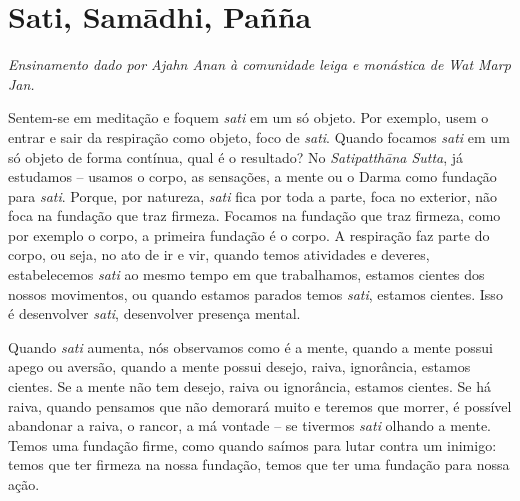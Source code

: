 
\chapter{Sati, Sam\=adhi, Pañña}

{\itshape
Ensinamento dado por Ajahn Anan à comunidade leiga e monástica de Wat
Marp Jan.}

Sentem-se em meditação e foquem \textit{sati} em um só objeto. Por
exemplo, usem o entrar e sair da respiração como objeto, foco de
\textit{sati}. Quando focamos \textit{sati} em um só objeto de forma
contínua, qual é o resultado? No \textit{Satipatth\=ana Sutta}, já
estudamos – usamos o corpo, as sensações, a mente ou o Darma como
fundação para \textit{sati}. Porque, por natureza, \textit{sati }fica
por toda a parte, foca no exterior, não foca na fundação que traz
firmeza. Focamos na fundação que traz firmeza, como por exemplo o
corpo, a primeira fundação é o corpo. A respiração faz parte do corpo,
ou seja, no ato de ir e vir, quando temos atividades e deveres,
estabelecemos \textit{sati} ao mesmo tempo em que trabalhamos, estamos
cientes dos nossos movimentos, ou quando estamos parados temos
\textit{sati}, estamos cientes. Isso é desenvolver \textit{sati},
desenvolver presença mental. 

Quando \textit{sati} aumenta, nós observamos como é a mente, quando
a mente possui apego ou aversão, quando a mente possui desejo, raiva,
ignorância, estamos cientes. Se a mente não tem desejo, raiva ou
ignorância, estamos cientes. Se há raiva, quando pensamos que não
demorará muito e teremos que morrer, é possível abandonar a raiva, o
rancor, a má vontade – se tivermos \textit{sati} olhando a mente. Temos
uma fundação firme, como quando saímos para lutar contra um inimigo:
temos que ter firmeza na nossa fundação, temos que ter uma fundação
para nossa ação. 

